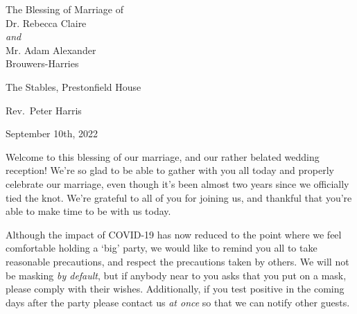 \documentclass[a5paper,12pt,titlepage]{article}
\begin{document}
\begin{titlepage}
    
        
    \centering
    \vspace*{7cm}
    \begin{adjustwidth}{-2cm}{-2cm}
    \centering
    {\LARGE The Blessing of Marriage of\\[1em]Dr. Rebecca Claire\\{\em and}\\ Mr. Adam Alexander \\[1em]{Brouwers-Harries}\par}
    \end{adjustwidth}
	\vspace{\fill}
    {\large The Stables, Prestonfield House\par}
    {\large Rev.~Peter Harris\par}
    {\large September 10th, 2022\par}
    \vspace{-2em}
    
\end{titlepage}

\hspace{2em}Welcome to this blessing of our marriage, and our rather belated wedding reception! We're so glad to be able to gather with you all today and properly celebrate our marriage, even though it's been almost two years since we officially tied the knot. We're grateful to all of you for joining us, and thankful that you're able to make time to be with us today.

\hspace{2em}Although the impact of COVID-19 has now reduced to the point where we feel comfortable holding a `big' party, we would like to remind you all to take reasonable precautions, and respect the precautions taken by others. We will not be masking {\em by default}, but if anybody near to you asks that you put on a mask, please comply with their wishes. Additionally, if you test positive in the coming days after the party please contact us {\em at once} so that we can notify other guests.
\end{document}
